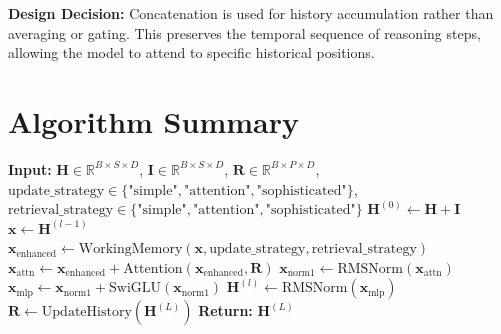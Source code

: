 \documentclass{article}
\begin{document}
\textbf{Design Decision:} Concatenation is used for history accumulation rather than averaging or gating. This preserves the temporal sequence of reasoning steps, allowing the model to attend to specific historical positions.

\section{Algorithm Summary}

\begin{algorithm}
\caption{System2Module Forward Pass with Memory Update and Retrieval Strategies}
\begin{algorithmic}[1]
\STATE \textbf{Input:} $\mathbf{H} \in \mathbb{R}^{B \times S \times D}$, $\mathbf{I} \in \mathbb{R}^{B \times S \times D}$, $\mathbf{R} \in \mathbb{R}^{B \times P \times D}$, $\text{update\_strategy} \in \{\text{"simple"}, \text{"attention"}, \text{"sophisticated"}\}$, $\text{retrieval\_strategy} \in \{\text{"simple"}, \text{"attention"}, \text{"sophisticated"}\}$
\STATE $\mathbf{H}^{(0)} \leftarrow \mathbf{H} + \mathbf{I}$
    \STATE $\mathbf{x} \leftarrow \mathbf{H}^{(l-1)}$
    \STATE $\mathbf{x}_{\text{enhanced}} \leftarrow \text{WorkingMemory}(\mathbf{x}, \text{update\_strategy}, \text{retrieval\_strategy})$
    \STATE $\mathbf{x}_{\text{attn}} \leftarrow \mathbf{x}_{\text{enhanced}} + \text{Attention}(\mathbf{x}_{\text{enhanced}}, \mathbf{R})$
    \STATE $\mathbf{x}_{\text{norm1}} \leftarrow \text{RMSNorm}(\mathbf{x}_{\text{attn}})$
    \STATE $\mathbf{x}_{\text{mlp}} \leftarrow \mathbf{x}_{\text{norm1}} + \text{SwiGLU}(\mathbf{x}_{\text{norm1}})$
    \STATE $\mathbf{H}^{(l)} \leftarrow \text{RMSNorm}(\mathbf{x}_{\text{mlp}})$
\ENDFOR
{}
    \STATE $\mathbf{R} \leftarrow \text{UpdateHistory}(\mathbf{H}^{(L)})$
\ENDIF
\STATE \textbf{Return:} $\mathbf{H}^{(L)}$
\end{algorithmic}
\end{algorithm}
\end{document}
